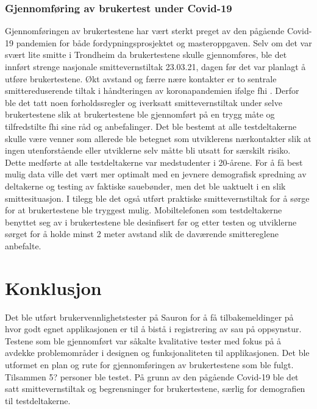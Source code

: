 \subsubsection{Gjennomføring av brukertest under Covid-19} \label{korona}
Gjennomføringen av brukertestene har vært sterkt preget av den pågående Covid-19 pandemien for både fordypningsprosjektet og masteroppgaven. Selv om det var svært lite smitte i Trondheim da brukertestene skulle gjennomføres, ble det innført strenge nasjonale smittevernstiltak 23.03.21, dagen før det var planlagt å utføre brukertestene. Økt avstand og færre nære kontakter er to sentrale smittereduserende tiltak i håndteringen av koronapandemien ifølge \acrfull{fhi} \cite{AvstandOgFaerre2020}. Derfor ble det tatt noen forholdssregler og iverksatt smittevernstiltak under selve brukertestene slik at brukertestene ble gjennomført på en trygg måte og tilfredstilte \acrshort{fhi} sine råd og anbefalinger. Det ble bestemt at alle testdeltakerne skulle være venner som allerede ble betegnet som utviklerens nærkontakter slik at ingen utenforstående eller utviklerne selv måtte bli utsatt for særskilt risiko. Dette medførte at alle testdeltakerne var medstudenter i 20-årene. For å få best mulig data ville det vært mer optimalt med en jevnere demografisk spredning av deltakerne og testing av faktiske sauebønder, men det ble uaktuelt i en slik smittesituasjon. I tilegg ble det også utført praktiske smittevernstiltak for å sørge for at brukertestene ble tryggest mulig. Mobiltelefonen som testdeltakerne benyttet seg av i brukertestene ble desinfisert før og etter testen og utviklerne sørget for å holde minst 2 meter avstand slik de daværende smittereglene anbefalte. 

\section{Konklusjon}
Det ble utført brukervennlighetstester på Sauron for å få tilbakemeldinger på hvor godt egnet applikasjonen er til å bistå i registrering av sau på oppsynstur. Testene som ble gjennomført var såkalte kvalitative tester med fokus på å avdekke problemområder i designen og funksjonaliteten til applikasjonen. Det ble utformet en plan og rute for gjennomføringen av brukertestene som ble fulgt. Tilsammen 5? personer ble testet. På grunn av den pågående Covid-19 ble det satt smittevernstiltak og begrensninger for brukertestene, særlig for demografien til testdeltakerne. 
